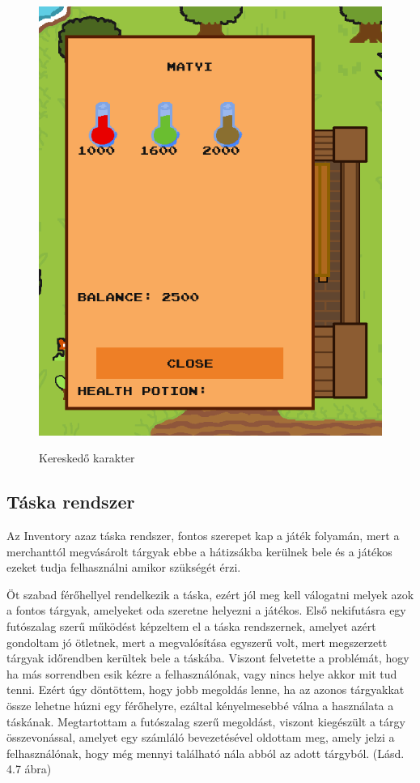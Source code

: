 \begin{figure}[H]
    \centering
    \includegraphics[width=9.0truecm]{images/merchant.png}
    \caption{Kereskedő karakter}
    \label{fig:Merchant}\cite{Merchant}
\end{figure}


\subsection{Táska rendszer}

\indent \indent Az Inventory azaz táska rendszer, fontos szerepet kap a játék folyamán, mert a merchanttól megvásárolt tárgyak ebbe a hátizsákba kerülnek bele és a játékos ezeket tudja felhasználni amikor szükségét érzi.

Öt szabad férőhellyel rendelkezik a táska, ezért jól meg kell válogatni melyek azok a fontos tárgyak, amelyeket oda szeretne helyezni a játékos. Első nekifutásra egy futószalag szerű működést képzeltem el a táska rendszernek, amelyet azért gondoltam jó ötletnek, mert a megvalósítása egyszerű volt, mert megszerzett tárgyak időrendben kerültek bele a táskába. Viszont felvetette a problémát, hogy ha más sorrendben esik kézre a felhasználónak, vagy nincs helye akkor mit tud tenni. Ezért úgy döntöttem, hogy jobb megoldás lenne, ha az azonos tárgyakkat össze lehetne húzni egy férőhelyre, ezáltal kényelmesebbé válna a használata a táskának. Megtartottam a futószalag szerű megoldást, viszont kiegészült a tárgy összevonással, amelyet egy számláló bevezetésével oldottam meg, amely jelzi a felhasználónak, hogy még mennyi található nála abból az adott tárgyból. (Lásd. 4.7 ábra)

